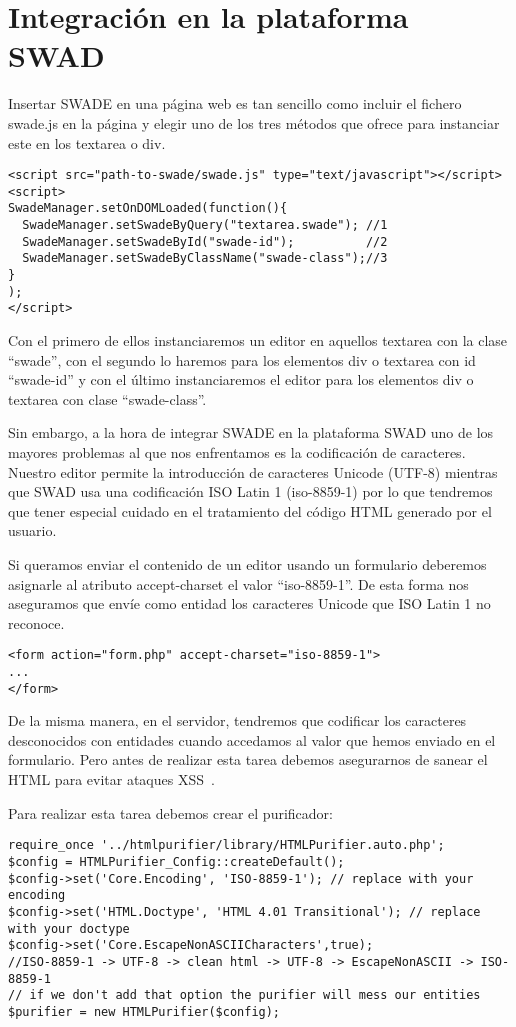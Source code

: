 \chapter{Integración en la plataforma SWAD}
Insertar SWADE en una página web es tan sencillo como incluir el fichero swade.js en la página y elegir uno de los tres métodos que ofrece para instanciar este en los textarea o div.

\begin{verbatim}
<script src="path-to-swade/swade.js" type="text/javascript"></script>
<script>
SwadeManager.setOnDOMLoaded(function(){
  SwadeManager.setSwadeByQuery("textarea.swade"); //1
  SwadeManager.setSwadeById("swade-id");          //2
  SwadeManager.setSwadeByClassName("swade-class");//3
}                      
);
</script>  
\end{verbatim}

Con el primero de ellos instanciaremos un editor en aquellos textarea con la clase ``swade'', con el segundo lo haremos para los elementos div o textarea con id ``swade-id'' y con el último instanciaremos el editor para los elementos div o textarea con clase ``swade-class''.

Sin embargo, a la hora de integrar SWADE en la plataforma SWAD uno de los mayores problemas al que nos enfrentamos es la codificación de caracteres. Nuestro editor permite la introducción de caracteres Unicode (UTF-8) mientras que SWAD usa una codificación ISO Latin 1 (iso-8859-1) por lo que tendremos que tener especial cuidado en el tratamiento del código HTML generado por el usuario.

Si queramos enviar el contenido de un editor usando un formulario deberemos asignarle al atributo accept-charset el valor ``iso-8859-1''. De esta forma nos aseguramos que envíe como entidad los caracteres Unicode que ISO Latin 1 no reconoce. 

\begin{verbatim}
<form action="form.php" accept-charset="iso-8859-1">
...
</form>
\end{verbatim}

De la misma manera, en el servidor, tendremos que codificar los caracteres desconocidos con entidades cuando accedamos al valor que hemos enviado en el formulario. Pero antes de realizar esta tarea debemos asegurarnos de sanear el HTML para evitar ataques XSS~\cite{xss}.

Para realizar esta tarea debemos crear el purificador:

\begin{verbatim}
require_once '../htmlpurifier/library/HTMLPurifier.auto.php';
$config = HTMLPurifier_Config::createDefault();
$config->set('Core.Encoding', 'ISO-8859-1'); // replace with your encoding
$config->set('HTML.Doctype', 'HTML 4.01 Transitional'); // replace with your doctype
$config->set('Core.EscapeNonASCIICharacters',true);
//ISO-8859-1 -> UTF-8 -> clean html -> UTF-8 -> EscapeNonASCII -> ISO-8859-1
// if we don't add that option the purifier will mess our entities
$purifier = new HTMLPurifier($config);
\end{verbatim}

